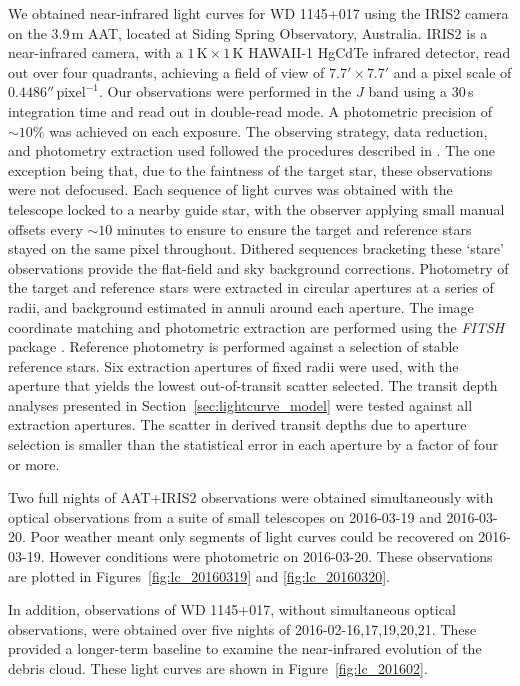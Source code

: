 \documentclass[apj]{emulateapj}
\begin{document}
We obtained near-infrared light curves for WD 1145+017 using the IRIS2 camera \citep{2004SPIE.5492..998T} on the 3.9\,m AAT, located at Siding Spring Observatory, Australia. IRIS2 is a near-infrared camera, with a $1\,\mathrm{K} \times 1\,\mathrm{K}$ HAWAII-1 HgCdTe infrared detector, read out over four quadrants, achieving a field of view of $7.7' \times 7.7 '$ and a pixel scale of $0.4486''\,\mathrm{pixel}^{-1}$. Our observations were performed in the $J$ band using a 30\,s integration time and read out in double-read mode. A photometric precision of $\sim 10\mathrm{\%}$ was achieved on each exposure. The observing strategy, data reduction, and photometry extraction used followed the procedures described in \citet{2014MNRAS.445.2746Z,2015MNRAS.454.3002Z}. The one exception being that, due to the faintness of the target star, these observations were not defocused. Each sequence of light curves was obtained with the telescope locked to a nearby guide star, with the observer applying small manual offsets every $\sim 10$ minutes to ensure to ensure the target and reference stars stayed on the same pixel throughout. Dithered sequences bracketing these `stare' observations provide the flat-field and sky background corrections. Photometry of the target and reference stars were extracted in circular apertures at a series of radii, and background estimated in annuli around each aperture. The image coordinate matching and photometric extraction are performed using the \emph{FITSH} package \citep{2012MNRAS.421.1825P}. Reference photometry is performed against a selection of stable reference stars. Six extraction apertures of fixed radii were used, with the aperture that yields the lowest out-of-transit scatter selected. The transit depth analyses presented in Section~\ref{sec:lightcurve_model} were tested against all extraction apertures. The scatter in derived transit depths due to aperture selection is smaller than the statistical error in each aperture by a factor of four or more. 

Two full nights of AAT+IRIS2 observations were obtained simultaneously with optical observations from a suite of small telescopes on 2016-03-19 and 2016-03-20. Poor weather meant only segments of light curves could be recovered on 2016-03-19. However conditions were photometric on 2016-03-20. These observations are plotted in Figures~\ref{fig:lc_20160319} and \ref{fig:lc_20160320}. 

In addition, observations of WD 1145+017, without simultaneous optical observations, were obtained over five nights of 2016-02-16,17,19,20,21. These provided a longer-term baseline to examine the near-infrared evolution of the debris cloud. These light curves are shown in Figure~\ref{fig:lc_201602}.
\end{document}
